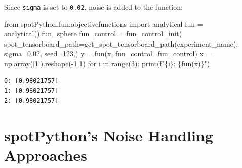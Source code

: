 \documentclass[
  letterpaper,
  DIV=11,
  numbers=noendperiod]{scrreprt}
\newenvironment{Shaded}{\begin{snugshade}}{\end{snugshade}}
\newcommand{\BuiltInTok}[1]{\textcolor[rgb]{0.00,0.23,0.31}{#1}}
\newcommand{\ControlFlowTok}[1]{\textcolor[rgb]{0.00,0.23,0.31}{#1}}
\newcommand{\DecValTok}[1]{\textcolor[rgb]{0.68,0.00,0.00}{#1}}
\newcommand{\FloatTok}[1]{\textcolor[rgb]{0.68,0.00,0.00}{#1}}
\newcommand{\ImportTok}[1]{\textcolor[rgb]{0.00,0.46,0.62}{#1}}
\newcommand{\KeywordTok}[1]{\textcolor[rgb]{0.00,0.23,0.31}{#1}}
\newcommand{\NormalTok}[1]{\textcolor[rgb]{0.00,0.23,0.31}{#1}}
\newcommand{\OperatorTok}[1]{\textcolor[rgb]{0.37,0.37,0.37}{#1}}
\newcommand{\SpecialCharTok}[1]{\textcolor[rgb]{0.37,0.37,0.37}{#1}}
\newcommand{\SpecialStringTok}[1]{\textcolor[rgb]{0.13,0.47,0.30}{#1}}
\begin{document}
\begin{tcolorbox}[enhanced jigsaw, opacityback=0, left=2mm, title=\textcolor{quarto-callout-note-color}{\faInfo}\hspace{0.5em}{Example: The same noise added to the sphere function}, bottomrule=.15mm, titlerule=0mm, arc=.35mm, leftrule=.75mm, colbacktitle=quarto-callout-note-color!10!white, bottomtitle=1mm, opacitybacktitle=0.6, coltitle=black, colframe=quarto-callout-note-color-frame, toprule=.15mm, breakable, colback=white, toptitle=1mm, rightrule=.15mm]

Since \texttt{sigma} is set to \texttt{0.02}, noise is added to the
function:

\begin{Shaded}
\begin{Highlighting}[]
\ImportTok{from}\NormalTok{ spotPython.fun.objectivefunctions }\ImportTok{import}\NormalTok{ analytical}
\NormalTok{fun }\OperatorTok{=}\NormalTok{ analytical().fun\_sphere}
\NormalTok{fun\_control }\OperatorTok{=}\NormalTok{ fun\_control\_init(}
\NormalTok{    spot\_tensorboard\_path}\OperatorTok{=}\NormalTok{get\_spot\_tensorboard\_path(experiment\_name),}
\NormalTok{    sigma}\OperatorTok{=}\FloatTok{0.02}\NormalTok{,}
\NormalTok{    seed}\OperatorTok{=}\DecValTok{123}\NormalTok{,)}
\NormalTok{y }\OperatorTok{=}\NormalTok{ fun(x, fun\_control}\OperatorTok{=}\NormalTok{fun\_control)}
\NormalTok{x }\OperatorTok{=}\NormalTok{ np.array([}\DecValTok{1}\NormalTok{]).reshape(}\OperatorTok{{-}}\DecValTok{1}\NormalTok{,}\DecValTok{1}\NormalTok{)}
\ControlFlowTok{for}\NormalTok{ i }\KeywordTok{in} \BuiltInTok{range}\NormalTok{(}\DecValTok{3}\NormalTok{):}
    \BuiltInTok{print}\NormalTok{(}\SpecialStringTok{f"}\SpecialCharTok{\{}\NormalTok{i}\SpecialCharTok{\}}\SpecialStringTok{: }\SpecialCharTok{\{}\NormalTok{fun(x)}\SpecialCharTok{\}}\SpecialStringTok{"}\NormalTok{)}
\end{Highlighting}
\end{Shaded}

\begin{verbatim}
0: [0.98021757]
1: [0.98021757]
2: [0.98021757]
\end{verbatim}

\end{tcolorbox}

\hypertarget{spotpythons-noise-handling-approaches}{%
\section{spotPython's Noise Handling
Approaches}\label{spotpythons-noise-handling-approaches}}
\end{document}
